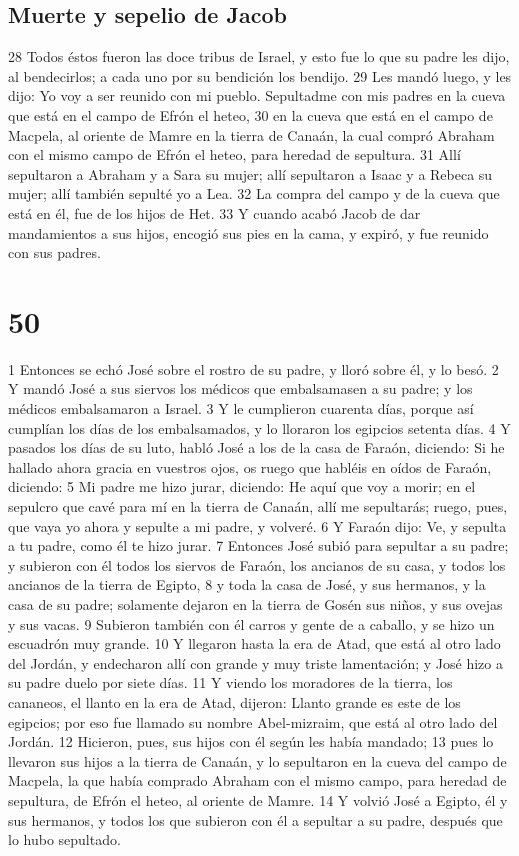 \section{Muerte y sepelio de Jacob}

28 Todos éstos fueron las doce tribus de Israel, y esto fue lo que su padre les dijo, al bendecirlos; a cada uno por su bendición los bendijo.
29 Les mandó luego, y les dijo: Yo voy a ser reunido con mi pueblo. Sepultadme con mis padres en la cueva que está en el campo de Efrón el heteo,
30 en la cueva que está en el campo de Macpela, al oriente de Mamre en la tierra de Canaán, la cual compró Abraham con el mismo campo de Efrón el heteo, para heredad de sepultura.
31 Allí sepultaron a Abraham y a Sara su mujer; allí sepultaron a Isaac y a Rebeca su mujer; allí también sepulté yo a Lea.
32 La compra del campo y de la cueva que está en él, fue de los hijos de Het.
33 Y cuando acabó Jacob de dar mandamientos a sus hijos, encogió sus pies en la cama, y expiró, y fue reunido con sus padres.

\chapter{50}

1 Entonces se echó José sobre el rostro de su padre, y lloró sobre él, y lo besó.
2 Y mandó José a sus siervos los médicos que embalsamasen a su padre; y los médicos embalsamaron a Israel.
3 Y le cumplieron cuarenta días, porque así cumplían los días de los embalsamados, y lo lloraron los egipcios setenta días.
4 Y pasados los días de su luto, habló José a los de la casa de Faraón, diciendo: Si he hallado ahora gracia en vuestros ojos, os ruego que habléis en oídos de Faraón, diciendo:
5 Mi padre me hizo jurar, diciendo: He aquí que voy a morir; en el sepulcro que cavé para mí en la tierra de Canaán, allí me sepultarás; ruego, pues, que vaya yo ahora y sepulte a mi padre, y volveré.
6 Y Faraón dijo: Ve, y sepulta a tu padre, como él te hizo jurar.
7 Entonces José subió para sepultar a su padre; y subieron con él todos los siervos de Faraón, los ancianos de su casa, y todos los ancianos de la tierra de Egipto,
8 y toda la casa de José, y sus hermanos, y la casa de su padre; solamente dejaron en la tierra de Gosén sus niños, y sus ovejas y sus vacas.
9 Subieron también con él carros y gente de a caballo, y se hizo un escuadrón muy grande.
10 Y llegaron hasta la era de Atad, que está al otro lado del Jordán, y endecharon allí con grande y muy triste lamentación; y José hizo a su padre duelo por siete días.
11 Y viendo los moradores de la tierra, los cananeos, el llanto en la era de Atad, dijeron: Llanto grande es este de los egipcios; por eso fue llamado su nombre Abel-mizraim, que está al otro lado del Jordán.
12 Hicieron, pues, sus hijos con él según les había mandado;
13 pues lo llevaron sus hijos a la tierra de Canaán, y lo sepultaron en la cueva del campo de Macpela, la que había comprado Abraham con el mismo campo, para heredad de sepultura, de Efrón el heteo, al oriente de Mamre.
14 Y volvió José a Egipto, él y sus hermanos, y todos los que subieron con él a sepultar a su padre, después que lo hubo sepultado.

